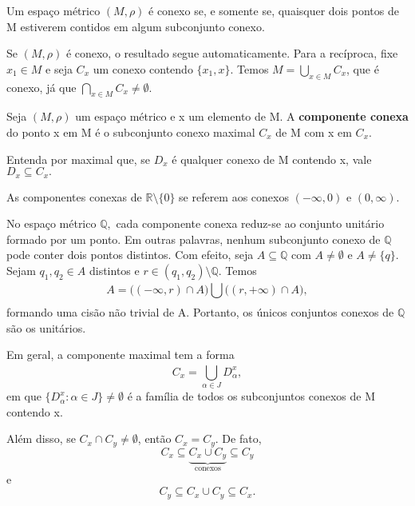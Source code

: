 \documentclass[MetricSpaces/metric_notes.tex]{subfiles}
\begin{document}
\begin{prop*}
	Um espaço métrico \((M, \rho )\) é conexo se, e somente se, quaisquer dois pontos de M estiverem contidos em algum subconjunto
	conexo.
\end{prop*}
\begin{proof*}
	Se \((M, \rho )\) é conexo, o resultado segue automaticamente. Para a recíproca, fixe \(x_{1}\in M\) e seja
	\(C_{x}\) um conexo contendo \(\{x_{1}, x\}\). Temos \(M = \bigcup_{x\in M}^{}{C_{x}}\), que é conexo, já que \(\bigcap_{x\in M}^{}{C_{x}}\neq\emptyset.\) \qedsymbol
\end{proof*}
\begin{def*}
	Seja \((M, \rho )\) um espaço métrico e x um elemento de M. A \textbf{componente conexa} do ponto x em M é o subconjunto conexo maximal
	\(C_{x}\) de M com x em \(C_{x}\).
\end{def*}
Entenda por maximal que, se \(D_{x}\) é qualquer conexo de M contendo x, vale \(D_{x}\subseteq{C_{x}}.\)
\begin{example}
	As componentes conexas de \(\mathbb{R}\setminus{\{0\}}\) se referem aos conexos \((-\infty, 0)\) e \((0, \infty).\)
\end{example}
\begin{example}
	No espaço métrico \(\mathbb{Q},\) cada componente conexa reduz-se ao conjunto unitário formado por um ponto. Em outras palavras,
	nenhum subconjunto conexo de \(\mathbb{Q}\) pode conter dois pontos distintos. Com efeito, seja \(A\subseteq{\mathbb{Q}}\) com \(A \neq\emptyset\)
	e \(A\neq\{q\}.\) Sejam \(q_{1}, q_{2}\in A\) distintos e \(r\in(q_{1}, q_{2})\setminus{\mathbb{Q}}\). Temos
	\[
		A = \biggl((-\infty, r)\cap A\biggr)\bigcup_{}^{}{\biggl((r, +\infty)\cap A\biggr)},
	\]
	formando uma cisão não trivial de A. Portanto, os únicos conjuntos conexos de \(\mathbb{Q}\) são os unitários.
\end{example}
Em geral, a componente maximal tem a forma
\[
	C_{x} = \bigcup_{\alpha \in J}^{}{D_{\alpha }^{x}},
\]
em que \(\{D_{\alpha }^{x}: \alpha \in J\}\neq\emptyset\) é a família de todos os subconjuntos conexos de M contendo x.

Além disso, se \(C_{x}\cap C_{y} \neq\emptyset\), então \(C_{x} = C_{y}.\) De fato,
\[
	C_{x} \subseteq\underbrace{{C_{x}\cup C_{y}}}_{\text{conexos}} \subseteq{C_{y}}
\]
e
\[
	C_{y}\subseteq{C_{x}\cup C_{y}}\subseteq{C_{x}}.
\]
\end{document}
